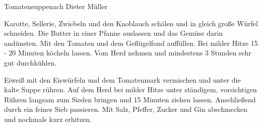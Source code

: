 \begin{recipe}{Tomatensuppe}{nach Dieter Müller}\label{Tomatensuppe}
  \inglist

  \steps

  Karotte, Sellerie, Zwiebeln und den Knoblauch schälen und in gleich große
  Würfel schneiden. Die Butter in einer Pfanne auslassen und das Gemüse darin
  andünsten. Mit den Tomaten und dem Geflügelfond auffüllen. Bei milder Hitze
  15 - 20 Minuten köcheln lassen. Vom Herd nehmen und mindestens 3 Stunden sehr
  gut durchkühlen.

  Eiweiß mit den Eiswürfeln und dem Tomatenmark vermischen und unter die kalte
  Suppe rühren. Auf dem Herd bei milder Hitze unter ständigem, vorsichtigen
  Rühren langsam zum Sieden bringen und 15 Minuten ziehen lassen. Anschließend
  durch ein feines Sieb passieren. Mit Salz, Pfeffer, Zucker und Gin
  abschmecken und nochmals kurz erhitzen.

\end{recipe}
